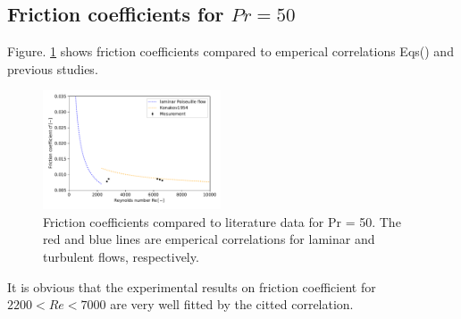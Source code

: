 \documentclass[conference]{IEEEtran}
\begin{document}
%
%


\subsection{Friction coefficients for $Pr=50$}
Figure. \ref{recf_pr50} shows friction coefficients compared to emperical correlations Eqs() and previous studies.
\begin{figure}[htbp]
  \centering
  \vspace{5zh}
  \includegraphics[width=0.47\textwidth,natwidth=400,natheight=200]{fig/recf_pr50.pdf}
  \caption{Friction coefficients compared to literature data for Pr = 50. The red and blue lines are emperical correlations for laminar and turbulent flows, respectively.}
  \label{recf_pr50}
\end{figure}
It is obvious that the experimental results on friction coefficient for $2200 < Re < 7000$ are very well fitted by the citted correlation.
\end{document}

